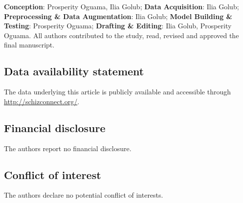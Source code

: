 \textbf{Conception}: Prosperity Oguama, Ilia Golub; \textbf{Data Acquisition}: Ilia Golub; \textbf{Preprocessing \& Data Augmentation}: Ilia Golub; \textbf{Model Building \& Testing}: Prosperity Oguama; \textbf{Drafting \& Editing}: Ilia Golub, Prosperity Oguama. All authors contributed to the study, read, revised and approved the final manuscript.

\subsection*{Data availability statement}
The data underlying this article is publicly available and accessible through \hyperlink{Schizconnect}{http://schizconnect.org/}.

\subsection*{Financial disclosure}

The authors report no financial disclosure.

\subsection*{Conflict of interest}

The authors declare no potential conflict of interests.

\renewcommand{\baselinestretch}{1.5}
\cleardoublepage    %


